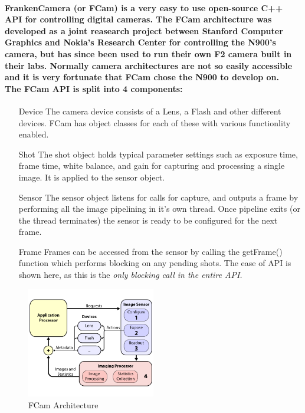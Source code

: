 \documentclass[11pt]{article} %
\begin{document}
\paragraph{FrankenCamera (or FCam) is a very easy to use open-source C++ API for controlling digital cameras.  The FCam architecture was developed as a joint reasearch project between Stanford Computer Graphics and Nokia's Research Center for controlling the N900's camera, but has since been used to run their own F2 camera built in their labs\cite{fcamdoc}. Normally camera architectures are not so easily accessible and it is very fortunate that FCam chose the N900 to develop on.
\\The FCam API is split into 4 components:}
\begin{enumerate}
\item[Device]{The camera device consists of a Lens, a Flash and other different devices. FCam has object classes for each of these with various functionlity enabled.}
\item[Shot]{The shot object holds typical parameter settings such as exposure time, frame time, white balance, and gain for capturing and processing a single image. It is applied to the sensor object.}
\item[Sensor]{The sensor object listens for calls for capture, and outputs a frame by performing all the image pipelining in it's own thread. Once pipeline exits (or the thread terminates) the sensor is ready to be configured for the next frame.}
\item[Frame]{Frames can be accessed from the sensor by calling the getFrame() function which performs blocking on any pending shots. The ease of API is shown here, as this is the \it{only} blocking call in the entire API.}
\end{enumerate}

\begin{figure}
	\vspace{-40pt}
	\begin{center}
		\includegraphics[width=0.5\textwidth]{../images/fcam_arch}
	\end{center}
	\vspace{-20pt}
	\caption{FCam Architecture}
\end{figure}
\end{document}
